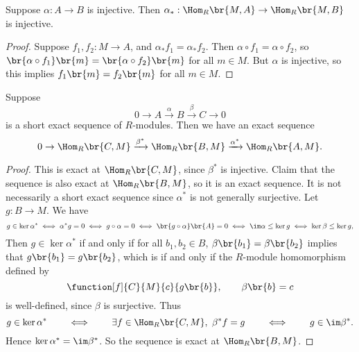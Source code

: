 \begin{proposition}
Suppose $ \alpha : A \to B $ is injective. Then $ \alpha_* : \Hom_R\br{M, A} \to \Hom_R\br{M, B} $ is injective.
\end{proposition}

\begin{proof}
Suppose $ f_1, f_2 : M \to A $, and $ \alpha_*f_1 = \alpha_*f_2 $. Then $ \alpha \circ f_1 = \alpha \circ f_2 $, so $ \br{\alpha \circ f_1}\br{m} = \br{\alpha \circ f_2}\br{m} $ for all $ m \in M $. But $ \alpha $ is injective, so this implies $ f_1\br{m} = f_2\br{m} $ for all $ m \in M $.
\end{proof}

\pagebreak

\begin{proposition}
Suppose
$$ 0 \to A \xrightarrow{\alpha} B \xrightarrow{\beta} C \to 0 $$
is a short exact sequence of $ R $-modules. Then we have an exact sequence
$$ 0 \to \Hom_R\br{C, M} \xrightarrow{\beta^*} \Hom_R\br{B, M} \xrightarrow{\alpha^*} \Hom_R\br{A, M}. $$
\end{proposition}

\begin{proof}
This is exact at $ \Hom_R\br{C, M} $, since $ \beta^* $ is injective. Claim that the sequence is also exact at $ \Hom_R\br{B, M} $, so it is an exact sequence. It is not necessarily a short exact sequence since $ \alpha^* $ is not generally surjective. Let $ g : B \to M $. We have
$$ g \in \ker \alpha^* \iff \alpha^*g = 0 \iff g \circ \alpha = 0 \iff \br{g \circ \alpha}\br{A} = 0 \iff \im \alpha \le \ker g \iff \ker \beta \le \ker g, $$
Then $ g \in \ker \alpha^* $ if and only if for all $ b_1, b_2 \in B $, $ \beta\br{b_1} = \beta\br{b_2} $ implies that $ g\br{b_1} = g\br{b_2} $, which is if and only if the $ R $-module homomorphism defined by
$$ \function[f]{C}{M}{c}{g\br{b}}, \qquad \beta\br{b} = c $$
is well-defined, since $ \beta $ is surjective. Thus
$$ g \in \ker \alpha^* \qquad \iff \qquad \exists f \in \Hom_R\br{C, M}, \ \beta^*f = g \qquad \iff \qquad g \in \im \beta^*. $$
Hence $ \ker \alpha^* = \im \beta^* $. So the sequence is exact at $ \Hom_R\br{B, M} $.
\end{proof}


